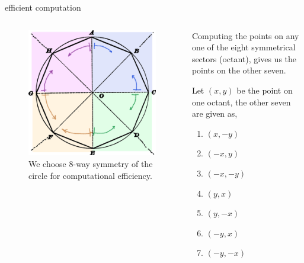 \documentclass[aspectratio=169,xcolor={dvipsnames,svgnames}]{beamer}
\begin{document}
\begin{frame}[label={sec:orgd4b4823}]{efficient computation}
\begin{columns}
\begin{column}{.45\columnwidth}
\begin{figure}[htbp]
\centering
\includegraphics[width=.9\linewidth]{images/circle-8way.png}
\caption{We choose 8-way symmetry of the circle for computational efficiency.}
\end{figure}
\end{column}


\begin{column}{.55\columnwidth}
Computing the points on any one of the eight
symmetrical sectors (\alert{octant}), gives us the points on
the other seven.

Let \((x,y)\) be the point on one octant, the other seven
are given as,
\begin{enumerate}
\item \((x,-y)\)
\item \((-x,y)\)
\item \((-x,-y)\)
\item \((y,x)\)
\item \((y,-x)\)
\item \((-y,x)\)
\item \((-y,-x)\)
\end{enumerate}
\end{column}
\end{columns}
\end{frame}
\end{document}
